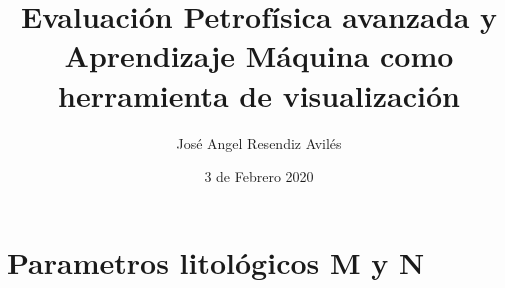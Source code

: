 \documentclass[12pt]{book}
\begin{document}
    
\title{Evaluación Petrofísica avanzada y Aprendizaje Máquina como herramienta de visualización}
\author{José Angel Resendiz Avilés}
\date{3 de Febrero 2020}
\maketitle

\chapter{Parametros litológicos M y N}
\end{document}
